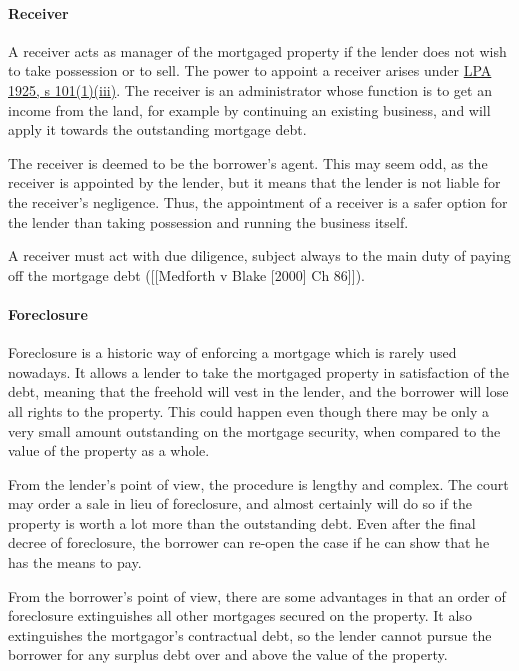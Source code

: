 \documentclass[
]{article}
\begin{document}
\hypertarget{receiver}{%
\paragraph{Receiver}\label{receiver}}

A receiver acts as manager of the mortgaged property if the lender does
not wish to take possession or to sell. The power to appoint a receiver
arises under
\href{https://www.legislation.gov.uk/ukpga/Geo5/15-16/20/section/101}{LPA
1925, s 101(1)(iii)}. The receiver is an administrator whose function is
to get an income from the land, for example by continuing an existing
business, and will apply it towards the outstanding mortgage debt.

The receiver is deemed to be the borrower's agent. This may seem odd, as
the receiver is appointed by the lender, but it means that the lender is
not liable for the receiver's negligence. Thus, the appointment of a
receiver is a safer option for the lender than taking possession and
running the business itself.

A receiver must act with due diligence, subject always to the main duty
of paying off the mortgage debt ({[}{[}Medforth v Blake {[}2000{]} Ch
86{]}{]}).

\hypertarget{foreclosure}{%
\paragraph{Foreclosure}\label{foreclosure}}

Foreclosure is a historic way of enforcing a mortgage which is rarely
used nowadays. It allows a lender to take the mortgaged property in
satisfaction of the debt, meaning that the freehold will vest in the
lender, and the borrower will lose all rights to the property. This
could happen even though there may be only a very small amount
outstanding on the mortgage security, when compared to the value of the
property as a whole.

From the lender's point of view, the procedure is lengthy and complex.
The court may order a sale in lieu of foreclosure, and almost certainly
will do so if the property is worth a lot more than the outstanding
debt. Even after the final decree of foreclosure, the borrower can
re-open the case if he can show that he has the means to pay.

From the borrower's point of view, there are some advantages in that an
order of foreclosure extinguishes all other mortgages secured on the
property. It also extinguishes the mortgagor's contractual debt, so the
lender cannot pursue the borrower for any surplus debt over and above
the value of the property.
\end{document}
